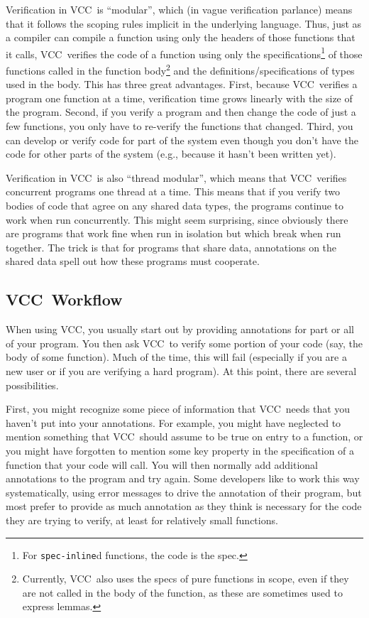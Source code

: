 \documentclass{report}
\newcommand{\Q}[1]{\lstinline~#1~}
\newcommand{\VCC}{VCC}
\begin{document}
Verification in \VCC\ is ``modular'', which (in vague verification
parlance) means that it follows the scoping rules implicit in the
underlying language. Thus, just as a compiler can compile a function
using only the headers of those functions that it calls,
\VCC\ verifies the code of a function using only the
specifications\footnote{For \Q{spec-inline}d functions, the code is the
  spec.} of those functions called in the function
body\footnote{Currently, \VCC\ also uses the specs of pure functions
  in scope, even if they are not called in the body of the function,
  as these are sometimes used to express lemmas.} and the definitions/specifications of types used in the
body. This has three great advantages. First, because \VCC\ verifies a
program one function at a time, verification time grows linearly with
the size of the program. Second, if you verify a program and then
change the code of just a few functions, you only have to re-verify
the functions that changed. Third, you can develop or verify code for
part of the system even though you don't have the code for other parts
of the system (e.g., because it hasn't been written yet).

Verification in \VCC\ is also ``thread modular'', which means that \VCC\
verifies concurrent programs one thread at a time. This means that if
you verify two bodies of code that agree on any shared data types, the
programs continue to work when run concurrently. This might seem
surprising, since obviously there are programs that work fine when run
in isolation but which break when run together. The trick is that for
programs that share data, annotations on the shared data spell out how
these programs must cooperate.

\subsection{\VCC\ Workflow}

When using \VCC, you usually start out by providing annotations for
part or all of your program. You then ask \VCC\ to verify some portion
of your code (say, the body of some function). Much of the time, this
will fail (especially if you are a new user or if you are verifying a hard
program). At this point, there are several possibilities.

First, you might recognize some piece of information
that \VCC\ needs that you haven't put into your annotations. For
example, you might have neglected to mention something that
\VCC\ should assume to be true on entry to a function, or you might
have forgotten to mention some key property in the specification of a
function that your code will call. You will then normally
add additional annotations to the program and try again. Some
developers like to work this way systematically, using error messages
to drive the annotation of their program, but most prefer to provide
as much annotation as they think is necessary for the code they are
trying to verify, at least for relatively small functions.
\end{document}
